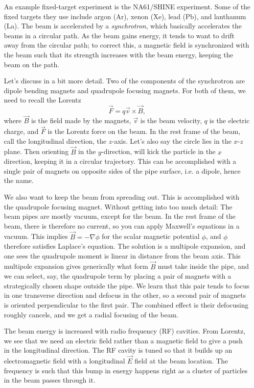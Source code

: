 An example fixed-target experiment is the NA61/SHINE experiment. 
Some of the fixed targets they use include argon (Ar), xenon (Xe), lead (Pb),
and lanthanum (La). The beam is accelerated by a {\it
synchrotron}, which basically accelerates the beams in a
circular path. As the beam gains energy, it tends to want to drift away from the
circular path; to correct this, a magnetic field is synchronized with the beam
such that its strength increases with the beam energy, keeping the beam on the
path.

Let's discuss in a bit more detail. Two of the components of the synchrotron are
dipole bending magnets and quadrupole focusing magnets. For both of them, we
need to recall the Lorentz
\begin{equation}
\vec{F}=q\vec{v}\times\vec{B},
\end{equation}
where $\vec{B}$ is the field made by the magnets, $\vec{v}$ is the beam velocity, $q$
is the electric charge, and $\vec{F}$ is the Lorentz force on the beam. In the
rest frame of the beam, call the longitudinal direction,
the $z$-axis. Let's also say the circle lies
in the $x$-$z$ plane. Then orienting $\vec{B}$ in the $y$-direction, will kick
the particle in the $x$ direction, keeping it in a circular
trajectory.
This can be accomplished
with a single pair of magnets on opposite sides of the pipe surface, 
i.e. a dipole, hence the name.

We also want to keep the beam from spreading out. This is accomplished with the
quadrupole focusing magnet. Without getting into too much detail: The beam pipes
are mostly vacuum, except for the beam. In the rest frame of the beam, there is
therefore no current, so you can apply Maxwell's equations in a vacuum.  
This implies $\vec{B}=-\nabla\phi$ for the scalar magnetic potential $\phi$,
and $\phi$ therefore satisfies Laplace's equation. The solution is a multipole
expansion, and one sees the quadrupole moment is linear in distance from the
beam axis. This multipole expansion gives generically what form $\vec{B}$ must
take inside the pipe, and we can select, say, the quadrupole term by placing
a pair of magnets with a strategically chosen shape outside the pipe. We learn
that this pair tends to focus in one transverse direction and defocus in the
other, so a second pair of magnets is oriented perpendicular to the first pair.
The combined effect is their defocusing roughly cancels, and we get a radial
focusing of the beam.

The beam energy is increased with radio frequency (RF) cavities. From Lorentz,
we see that we need an electric field rather than a magnetic field to give a
push in the longitudinal direction. The RF cavity is tuned so that it builds up
an electromagnetic field with a longitudinal $\vec{E}$ field at the beam
location. The frequency is such that this bump in energy happens right as a
cluster of particles in the beam passes through it. 

